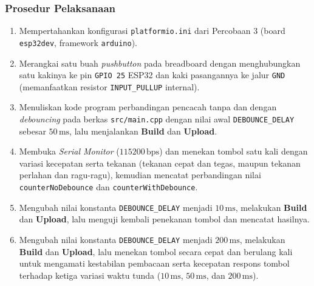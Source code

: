 \subsubsection*{Prosedur Pelaksanaan}
\begin{enumerate}[label=\arabic*.]
    \item Mempertahankan konfigurasi \texttt{platformio.ini} dari Percobaan 3 (board \texttt{esp32dev}, framework \texttt{arduino}).
    \item Merangkai satu buah \textit{pushbutton} pada breadboard dengan menghubungkan satu kakinya ke pin \texttt{GPIO 25} ESP32 dan kaki pasangannya ke jalur \texttt{GND} (memanfaatkan resistor \texttt{INPUT\_PULLUP} internal).
    \item Menuliskan kode program perbandingan pencacah tanpa dan dengan \textit{debouncing} pada berkas \texttt{src/main.cpp} dengan nilai awal \texttt{DEBOUNCE\_DELAY} sebesar $50\,\text{ms}$, lalu menjalankan \textbf{Build} dan \textbf{Upload}.
    \item Membuka \textit{Serial Monitor} ($115200\,\text{bps}$) dan menekan tombol satu kali dengan variasi kecepatan serta tekanan (tekanan cepat dan tegas, maupun tekanan perlahan dan ragu-ragu), kemudian mencatat perbandingan nilai \texttt{counterNoDebounce} dan \texttt{counterWithDebounce}.
    \item Mengubah nilai konstanta \texttt{DEBOUNCE\_DELAY} menjadi $10\,\text{ms}$, melakukan \textbf{Build} dan \textbf{Upload}, lalu menguji kembali penekanan tombol dan mencatat hasilnya.
    \item Mengubah nilai konstanta \texttt{DEBOUNCE\_DELAY} menjadi $200\,\text{ms}$, melakukan \textbf{Build} dan \textbf{Upload}, lalu menekan tombol secara cepat dan berulang kali untuk mengamati kestabilan pembacaan serta kecepatan respons tombol terhadap ketiga variasi waktu tunda ($10\,\text{ms}$, $50\,\text{ms}$, dan $200\,\text{ms}$).
\end{enumerate}

